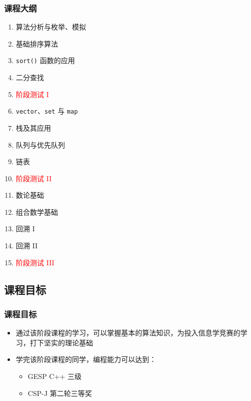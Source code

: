 \begin{frame}[fragile]
    \frametitle{课程大纲}

    \begin{multicols}{2}
        \begin{enumerate}
            \item<1-> 算法分析与枚举、模拟
            \item<1-> 基础排序算法
            \item<1-> \lstinline|sort()| 函数的应用
            \item<1-> 二分查找
            \item<1-> \textcolor{red}{阶段测试 I}
            \item<2-> \lstinline|vector|、\lstinline|set| 与 \lstinline|map|
            \item<2-> 栈及其应用
            \item<2-> 队列与优先队列
            \item<2-> 链表
            \item<2-> \textcolor{red}{阶段测试 II}
            \item<3-> 数论基础
            \item<3-> 组合数学基础
            \item<3-> 回溯 I
            \item<3-> 回溯 II
            \item<3-> \textcolor{red}{阶段测试 III}
        \end{enumerate}
    \end{multicols}
\end{frame}

\subsection{课程目标}

\begin{frame}[fragile]
    \frametitle{课程目标}

    \begin{itemize}[<+->]
        \item 通过该阶段课程的学习，可以掌握基本的算法知识，为投入信息学竞赛的学习，打下坚实的理论基础

        \item 学完该阶段课程的同学，编程能力可以达到：

            \begin{itemize}
                \item GESP C++ 三级
                \item CSP-J 第二轮三等奖
            \end{itemize}
    \end{itemize}
\end{frame}


